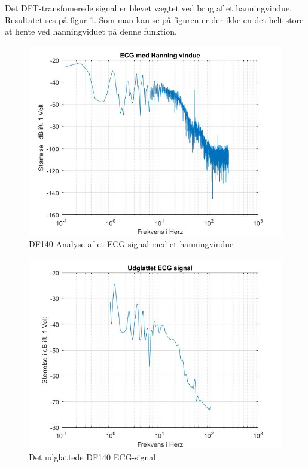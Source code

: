 Det DFT-transfomerede signal er blevet vægtet ved brug af et hanningvindue. Resultatet ses på figur \ref{fig:ECG hanning}. Som man kan se på figuren er der ikke en det helt store at hente ved hanningviduet på denne funktion.
\begin{figure}[H]
	\centering
	\includegraphics[width=140mm]{figures/ECG/hanning.jpg}
	\caption{DF140 Analyse af et ECG-signal med et hanningvindue}
	\label{fig:ECG hanning}
\end{figure}

\begin{figure}[H]
	\centering
	\includegraphics[width=140mm]{figures/ECG/udglattet.jpg}
	\caption{Det udglattede DF140 ECG-signal}
	\label{fig:ECG udglattet}
\end{figure}

